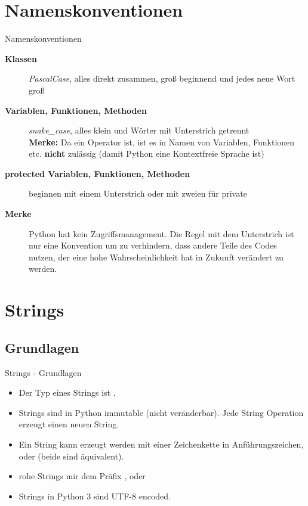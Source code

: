 \section{Namenskonventionen}
\begin{frame}[fragile]{Namenskonventionen}
	\begin{description}
	    \item[\textbf{Klassen}] \textit{PascalCase}, alles direkt zusammen, groß beginnend und jedes neue Wort groß
	    \item[\textbf{Variablen, Funktionen, Methoden}] \textit{snake\_case}, alles klein und Wörter mit Unterstrich getrennt \\
	    \textbf{Merke:} Da \codeline{-} ein Operator ist, ist es in Namen von Variablen, Funktionen etc. \textbf{nicht} zulässig (damit Python eine Kontextfreie Sprache ist)
	    \item[\textbf{protected Variablen, Funktionen, Methoden}] beginnen mit einem Unterstrich \codeline{\_} oder mit zweien \codeline{\_\_} für private
	    \item[\textbf{Merke}] Python hat kein Zugriffsmanagement. Die Regel mit dem Unterstrich ist nur eine Konvention um zu verhindern, dass andere Teile des Codes nutzen, der eine hohe Wahrscheinlichkeit hat in Zukunft verändert zu werden.
	\end{description}
\end{frame}


\section{Strings}
\subsection{Grundlagen}
\begin{frame}[fragile]{Strings - Grundlagen}
	\begin{itemize}
	    \item Der Typ eines Strings ist .
	    \item Strings sind in Python immutable (nicht veränderbar). Jede String Operation erzeugt einen neuen String.
	    \item Ein String kann erzeugt werden mit einer Zeichenkette in Anführungszeichen, \codeline{\'\'} oder \codeline{\"\"} (beide sind äquivalent).
	    \item rohe Strings mir dem Präfix ,  oder 
	    \item Strings in Python 3 sind UTF-8 encoded.
	\end{itemize}
\end{frame}


